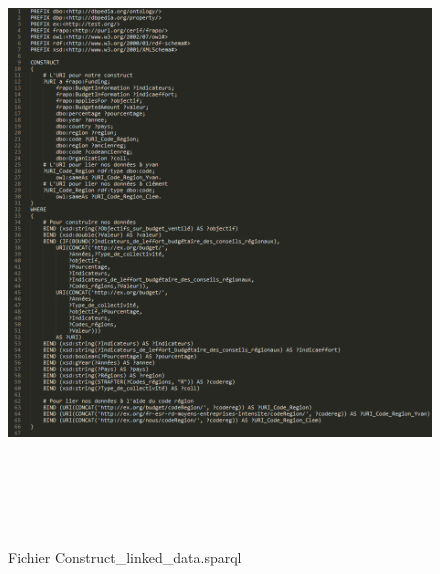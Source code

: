 \documentclass[a4paper,sffamily,12pt]{article}
\begin{document}
		\begin{figure}[!h]
			
			\vspace{0.5cm}	
			\centerline{\includegraphics[height=17cm]{picture/constructv2.png}}
			\caption{Fichier Construct\_linked\_data.sparql}
			\label{constructv2}
			
		\end{figure}		
	
		\vspace{1cm}		
								
\end{document}
